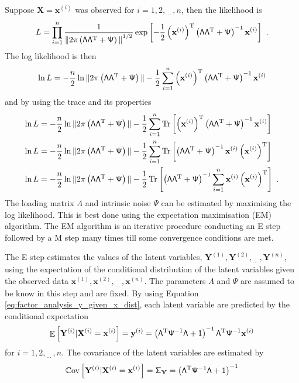 \documentclass[12pt]{report}
\DeclareMathOperator{\expectation}{\mathbb{E}}
\DeclareMathOperator{\cov}{\mathbb{C}ov}
\DeclareMathOperator{\trace}{Tr}
\newcommand{\T}{^\textup{T}}
\newcommand{\dotdotdot}{_{\phantom{.}\cdots}}
\newcommand{\vect}[1]{\mathbf{#1}}
\newcommand{\matr}[1]{\mathsf{#1}}
\begin{document}
Suppose $\vect{X}=\vect{x}^{(i)}$ was observed for $i=1,2,\dotdotdot,n$, then the likelihood is
\begin{equation}
L=\prod_{i=1}^n\frac{1}{{\|2\pi\left(\matr{\Lambda}\matr{\Lambda}\T+\matr{\Psi}\right)\|}^{1/2}}
\exp\left[-\frac{1}{2}\left(\vect{x}^{(i)}\right)\T\left(\matr{\Lambda}\matr{\Lambda}\T+\matr{\Psi}\right)^{-1}\vect{x}^{(i)}\right] \ .
\end{equation}
The log likelihood is then
\begin{equation*}
\ln{L}=-\frac{n}{2}\ln{\|2\pi\left(\matr{\Lambda}\matr{\Lambda}\T+\matr{\Psi}\right)\|}-\frac{1}{2}\sum_{i=1}^{n}\left(\vect{x}^{(i)}\right)\T\left(\matr{\Lambda}\matr{\Lambda}\T+\matr{\Psi}\right)^{-1}\vect{x}^{(i)}
\end{equation*}
and by using the trace and its properties
\begin{align}
\ln{L}&=-\frac{n}{2}\ln{\|2\pi\left(\matr{\Lambda}\matr{\Lambda}\T+\matr{\Psi}\right)\|}-\frac{1}{2}\sum_{i=1}^{n}\trace\left[\left(\vect{x}^{(i)}\right)\T\left(\matr{\Lambda}\matr{\Lambda}\T+\matr{\Psi}\right)^{-1}\vect{x}^{(i)}\right]
\nonumber \\
\ln{L}&=-\frac{n}{2}\ln{\|2\pi\left(\matr{\Lambda}\matr{\Lambda}\T+\matr{\Psi}\right)\|}-\frac{1}{2}\sum_{i=1}^{n}\trace\left[\left(\matr{\Lambda}\matr{\Lambda}\T+\matr{\Psi}\right)^{-1}\vect{x}^{(i)}\left(\vect{x}^{(i)}\right)\T\right]
\nonumber \\
\ln{L}&=-\frac{n}{2}\ln{\|2\pi\left(\matr{\Lambda}\matr{\Lambda}\T+\matr{\Psi}\right)\|}-\frac{1}{2}\trace\left[\left(\matr{\Lambda}\matr{\Lambda}\T+\matr{\Psi}\right)^{-1}\sum_{i=1}^{n}\vect{x}^{(i)}\left(\vect{x}^{(i)}\right)\T\right] \ .
\end{align}
The loading matrix $\matr{\Lambda}$ and intrinsic noise $\matr{\Psi}$ can be estimated by maximising the log likelihood. This is best done using the expectation maximisation (EM) algorithm. The EM algorithm is an iterative procedure conducting an E step followed by a M step many times till some convergence conditions are met.

The E step estimates the values of the latent variables, $\vect{Y}^{(1)},\vect{Y}^{(2)},\dotdotdot,\vect{Y}^{(n)}$, using the expectation of the conditional distribution of the latent variables given the observed data $\vect{x}^{(1)},\vect{x}^{(2)},\dotdotdot,\vect{x}^{(n)}$. The parameters $\matr{\Lambda}$ and $\matr{\Psi}$ are assumed to be know in this step and are fixed. By using Equation \eqref{eq:factor_analysis_y_given_x_dist}, each latent variable are predicted by the conditional expectation
\begin{equation}
\expectation\left[\vect{Y}^{(i)}|\vect{X}^{(i)}=\vect{x}^{(i)}\right]=\vect{y}^{(i)} = \left(\matr{\Lambda}\T\matr{\Psi}^{-1}\matr{\Lambda}+\matr{1}\right)^{-1}\matr{\Lambda}\T\matr{\Psi}^{-1}\vect{x}^{(i)}
\end{equation}
for $i=1,2,\dotdotdot,n$. The covariance of the latent variables are estimated by
\begin{equation}
\cov\left[\vect{Y}^{(i)}|\vect{X}^{(i)}=\vect{x}^{(i)}\right]=\matr{\Sigma}_{\vect{Y}} = \left(\matr{\Lambda}\T\matr{\Psi}^{-1}\matr{\Lambda}+\matr{1}\right)^{-1}
\end{equation}
\end{document}

